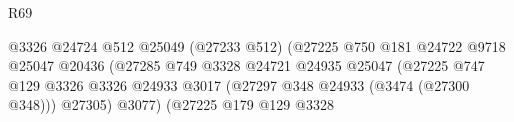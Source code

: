\begin{lexlean}{R69}
\begin{coremodule}
                                                                @3326
                                                                @24724
                                                                @512
                                                                @25049
                                                                (@27233 @512)
                                                                (@27225
                                                                  @750
                                                                  @181
                                                                  @24722
                                                                  @9718
                                                                  @25047
                                                                  @20436
                                                                  (@27285
                                                                    @749
                                                                    @3328
                                                                    @24721
                                                                    @24935
                                                                    @25047
                                                                    (@27225
                                                                      @747
                                                                      @129
                                                                      @3326
                                                                      @3326
                                                                      @24933
                                                                      @3017
                                                                      (@27297
                                                                        @348
                                                                        @24933
                                                                        (@3474 (@27300 @348)))
                                                                      @27305)
                                                                    @3077)
                                                                  (@27225
                                                                    @179
                                                                    @129
                                                                    @3328

\end{coremodule}
\end{lexlean}
